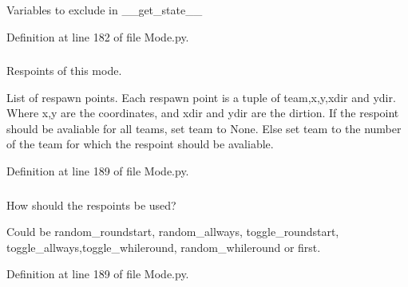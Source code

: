 \-Variables to exclude in \-\_\-\-\_\-get\-\_\-state\-\_\-\-\_\- 

\-Definition at line 182 of file \-Mode.\-py.

\hypertarget{class_mode_1_1_mode_ae63526644bd406d62fe471ac911e6720}{
\subsubsection[{\-\_\-\-\_\-respoints}]{}}
\label{class_mode_1_1_mode_ae63526644bd406d62fe471ac911e6720}


\-Respoints of this mode. 

\-List of respawn points. \-Each respawn point is a tuple of team,x,y,xdir and ydir. \-Where x,y are the coordinates, and xdir and ydir are the dirtion. \-If the respoint should be avaliable for all teams, set team to \-None. \-Else set team to the number of the team for which the respoint should be avaliable. 

\-Definition at line 189 of file \-Mode.\-py.

\hypertarget{class_mode_1_1_mode_a687ff64beaaef06119c3daf15bb59db8}{
\subsubsection[{\-\_\-\-\_\-restype}]{}}
\label{class_mode_1_1_mode_a687ff64beaaef06119c3daf15bb59db8}


\-How should the respoints be used? 

\-Could be random\-\_\-roundstart, random\-\_\-allways, toggle\-\_\-roundstart, toggle\-\_\-allways,toggle\-\_\-whileround, random\-\_\-whileround or first. 

\-Definition at line 189 of file \-Mode.\-py.

